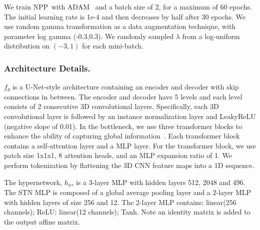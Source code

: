 \documentclass[runningheads]{llncs}
\newcommand{\modelname}{NPP}
\begin{document}
We train \modelname~with ADAM~\cite{Kingma2014} and a batch size of 2, for a maximum of 60 epochs. The initial learning rate is 1e-4 and then decreases by half after 30 epochs. 
We use random gamma transformation as a data augmentation technique, with parameter log gamma (-0.3,0.3). We randomly sampled $\lambda$ from a log-uniform distribution on $(-3, 1)$ for each mini-batch.


\subsubsection{Architecture Details.}
$f_\theta$ is a U-Net-style architecture containing an encoder and decoder with skip connections in between. The encoder and decoder have 5 levels and each level consists of 2 consecutive 3D convolutional layers. Specifically, each 3D convolutional layer is followed by an instance normalization layer and LeakyReLU (negative slope of 0.01). In the bottleneck, we use three transformer blocks to enhance the ability of capturing global information~\cite{vaswani2017attention}. Each transformer block contains a self-attention layer and a MLP layer. For the transformer block, we use patch size 1x1x1, 8 attention heads, and an MLP expansion ratio of 1. We perform tokenization by flattening the 3D CNN feature maps into a 1D sequence. 


The hypernetwork, $h_\phi$, is a 3-layer MLP with hidden layers 512, 2048 and 496. The STN MLP is composed of a global average pooling layer and a 2-layer MLP with hidden layers of size 256 and 12. The 2-layer MLP contains: linear(256 channels); ReLU; linear(12 channels); Tanh. Note an identity matrix is added to the output affine matrix.
\end{document}
